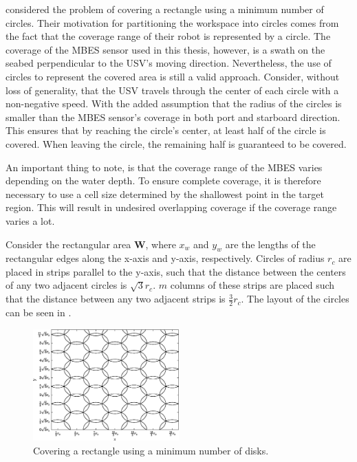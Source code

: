 \citet{guo2004coverage} considered the problem of covering a rectangle using a minimum number of circles. Their motivation for partitioning the workspace into circles comes from the fact that the coverage range of their robot is represented by a circle. The coverage of the MBES sensor used in this thesis, however, is a swath on the seabed perpendicular to the USV's moving direction. Nevertheless, the use of circles to represent the covered area is still a valid approach. Consider, without loss of generality, that the USV travels through the center of each circle with a non-negative speed. With the added assumption that the radius of the circles is smaller than the MBES sensor's coverage in both port and starboard direction. This ensures that by reaching the circle's center, at least half of the circle is covered. When leaving the circle, the remaining half is guaranteed to be covered.

An important thing to note, is that the coverage range of the MBES varies depending on the water depth. To ensure complete coverage, it is therefore necessary to use a cell size determined by the shallowest point in the target region. This will result in undesired overlapping coverage if the coverage range varies a lot.


Consider the rectangular area $\bm{W}$, where $x_w$ and $y_w$ are the lengths of the rectangular edges along the x-axis and y-axis, respectively. Circles of radius $r_c$ are placed in strips parallel to the y-axis, such that the distance between the centers of any two adjacent circles is $\sqrt{3}r_c$. $m$ columns of these strips are placed such that the distance between any two adjacent strips is $\frac{3}{2}r_c$. The layout of the circles can be seen in .

\begin{figure}[h!]
	\centering
	\includegraphics[width=0.5\textwidth]{fig/ccpp/circular_partition}
	\caption{Covering a rectangle using a minimum number of disks.}
	\label{fig:circular_partition}
\end{figure}

